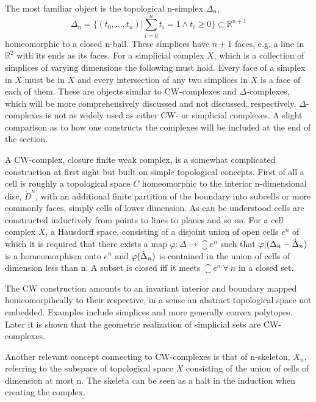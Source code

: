 \documentclass[../../main.tex]{subfiles}
\begin{document}
    The most familiar object is the topological n-simplex $\Delta_n$,
    \begin{equation}
        \Delta_n = \{(t_0, . . . , t_n)  |\sum_{i=0}^{n}t_i=1 \wedge t_i \geq 0\} \subset \mathbb{R}^{n+1}
    \end{equation}
    homeomorphic to a closed n-ball. These simplices have $n+1$ faces, e.g. a line in $\mathbb{R}^2$ with its ends as its faces. For a simplicial complex $X$, which is a collection of simplices of varying dimensions the following must hold. Every face of a simplex in $X$ must be in $X$ and every intersection of any two simplices in $X$ is a face of each of them. These are objects similar to CW-complexes and $\Delta$-complexes, which will be more comprehensively discussed and not discussed, respectively. $\Delta$-complexes is not as widely used as either CW- or simplicial complexes. A slight comparison as to how one constructs the complexes will be included at the end of the section. 
    
    A CW-complex, closure finite weak complex, is a somewhat complicated construction at first sight but built on simple topological concepts. First of all a cell is roughly a topological space $C$ homeomorphic to the interior n-dimensional disc, $\mathring{D}^n$, with an additional finite partition of the boundary into subcells or more commonly faces, simply cells of lower dimension. As can be understood cells are constructed inductively from points to lines to planes and so on. For a cell complex $X$, a Hausdorff space, consisting of a disjoint union of open cells $e^n$ of which it is required that there exists a map $\varphi:\Delta\to\closure{e}^n$ such that $\varphi|(\Delta_n - \dot{\Delta}_n )$ is a homeomorphism onto $e^n$ and $\varphi(\dot{\Delta}_n)$ is contained in the union of cells of dimension less than n. A subset is closed iff it meets $\closure{e}^n\:\forall \:n$ in a closed set. 
    
    The CW construction amounts to an invariant interior and boundary mapped homeomorpihcally to their respective, in a sense an abstract topological space not embedded. Examples include simplices and more generally convex polytopes. Later it is shown that the geometric realization of simplicial sets are CW-complexes.
    
    Another relevant concept connecting to CW-complexes is that of n-skeleton, $X_n$, referring to the subspace of topological space $X$ consisting of the union of cells of dimension at most n. The skeleta can be seen as a halt in the induction when creating the complex. 
\end{document}
